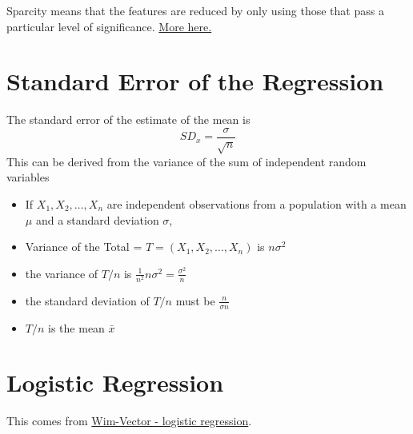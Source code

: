\documentclass[12pt, a4paper, oneside]{article}\usepackage[]{graphicx}\usepackage[]{color}
\begin{document}
Sparcity means that the features are reduced by only using those that pass a particular level of significance.  \href{http://statweb.stanford.edu/~tibs/lasso.html}{More here.}

\section{Standard Error of the Regression}
The standard error of the estimate of the mean is 
\begin{equation}
SD_x = \frac{\sigma}{\sqrt{n}}
\end{equation}
This can be derived from the variance of the sum of independent random variables
\begin{itemize}
\item If $X_1, X_2, \dots, X_n$ are independent observations from a population with a mean $\mu$ and a standard deviation $\sigma$, 
\item Variance of the Total = $T = (X_1, X_2, \dots, X_n)$ is $n\sigma^2$
\item the variance of $T/n$ is $\frac{1}{n^2}n\sigma^2 = \frac{\sigma^2}{n}$
\item the standard deviation of $T/n$ must be $\frac{n}{\sigma n}$
\item $T/n$ is the mean $\bar{x}$
\end{itemize}

\section{Logistic Regression}
This comes from \href{http://www.win-vector.com/blog/2010/11/learn-a-powerful-machine-learning-tool-logistic-regression-and-beyond/}{Wim-Vector - logistic regression}.  
\end{document}
